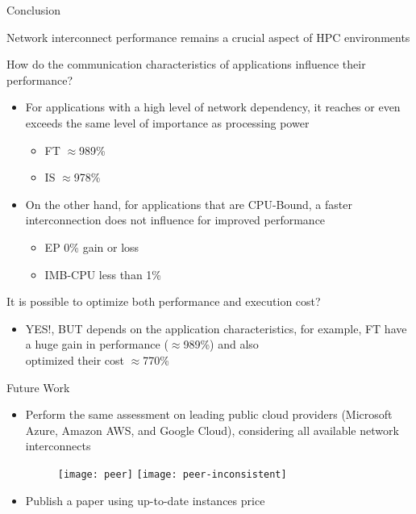\documentclass{beamer}
\begin{document}
\begin{frame}{Conclusion}

Network interconnect performance remains a crucial aspect of HPC environments

\pause How do the communication characteristics of applications influence their performance?
\begin{itemize}
    \pause \item For applications with a high level of network dependency, it reaches or even exceeds the same level of importance as processing power
    \begin{itemize}
        \item FT $\approx$989\%
        \item IS $\approx$978\%
    \end{itemize} 
    \pause\item On the other hand, for applications that are CPU-Bound, a faster interconnection does not influence for improved performance
    \begin{itemize}
        \item EP 0\% gain or loss
        \item IMB-CPU less than 1\%
    \end{itemize}
\end{itemize}
\pause It is possible to optimize both performance and execution cost?
\begin{itemize}
    \pause\item YES!, BUT depends on the application characteristics, for example, FT have a huge gain in performance ($\approx$989\%) and also\\ optimized their cost $\approx$770\%
\end{itemize}
\end{frame}

\begin{frame}[t]{Future Work}
\begin{itemize}
    \item Perform the same assessment on leading public cloud providers (Microsoft Azure, Amazon AWS, and Google Cloud), considering all available network interconnects
   \begin{figure}
   \texttt{[image: peer]}
   \hfill
   \texttt{[image: peer-inconsistent]}
\end{figure}
    \pause\item Publish a paper using up-to-date instances price
\end{itemize}
\end{frame}
\logo{}
\end{document}
